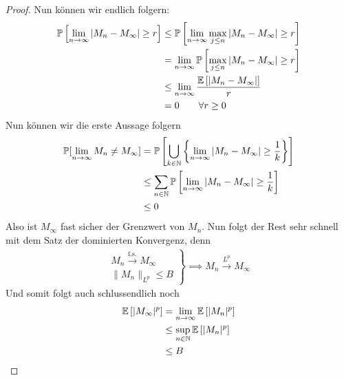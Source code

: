 \documentclass[12pt,a4paper]{article}
\begin{document}
\begin{proof}
	Nun können wir endlich folgern:
	\begin{align*}
		\mathbb{P}\left[\lim\limits_{n\rightarrow\infty}|M_n-M_\infty| \geq r\right] 
		&\leq
		\mathbb{P}\left[\lim\limits_{n\rightarrow\infty}\max\limits_{j\leq n}|M_n-M_\infty| \geq r\right]  \\
		&=\lim\limits_{n\rightarrow\infty}\mathbb{P}\left[\max\limits_{j\leq n}|M_n-M_\infty| \geq r\right]  \\
		&\leq\lim\limits_{n\rightarrow\infty}\frac{\mathbb{E}\left[|M_n-M_\infty|\right]}{r}  \\
		&= 0 \qquad \forall r\geq 0
	\end{align*}
	Nun können wir die erste Aussage folgern
	\begin{align*}
		\mathbb{P}[\lim\limits_{n\rightarrow\infty}M_n \neq M_\infty]
		&=\mathbb{P}\left[\bigcup\limits_{k\in\mathbb{N}}\left\lbrace\lim\limits_{n\rightarrow\infty}|M_n-M_\infty| \geq \frac{1}{k}\right\rbrace\right] \\
		&\leq \sum\limits_{n\in\mathbb{N}}
		\mathbb{P}\left[\lim\limits_{n\rightarrow\infty}|M_n-M_\infty| \geq \frac{1}{k}\right] \\
		&\leq 0
	\end{align*}
	Also ist $M_\infty$ fast sicher der Grenzwert von $M_n$. Nun folgt der Rest sehr schnell mit dem Satz der dominierten Konvergenz, denn
	\begin{align*}
		\left.\begin{array}{c}
				M_n \stackrel{\text{f.s.}}{\rightarrow}M_\infty \\
				\|M_n\|_{L^p} \leq B 
			\end{array}\right\rbrace\implies M_n \stackrel{L^p}{\rightarrow}M_\infty
	\end{align*}
	Und somit folgt auch schlussendlich noch
	\begin{align*}
		\mathbb{E}\left[|M_\infty|^p\right] &= 
		\lim\limits_{n\rightarrow\infty}\mathbb{E}\left[|M_n|^p\right]  \\
		&\leq \sup\limits_{n\in\mathbb{N}}\mathbb{E}\left[|M_n|^p\right] \\
		&\leq B
	\end{align*}

\end{proof}
\end{document}
